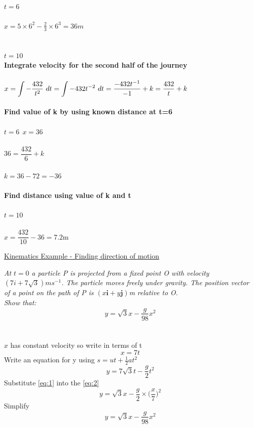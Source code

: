 \documentclass{article}[18pt]
\begin{document}
\\
$t=6$\\
\\
$x=5\times6^2-\frac{2}{3}\times6^3=36m$\\
\\
\\
$\mathit{t = 10}$
\\
\textbf{Integrate velocity for the second half of the journey}\\
\\
$x=\mathlarger{\int-\dfrac{432}{t^2} \ dt=\int-432t^{-2} \ dt=\dfrac{-432t^{-1}}{-1}+k=\dfrac{432}{t}+k}$\\
\\
\textbf{Find value of k by using known distance at t=6}\\
\\
$t=6 \ \ x=36$\\
\\
$36=\dfrac{432}{6}+k$\\
\\
$k=36-72=-36$\\
\\
\textbf{Find distance using value of k and t}\\
\\
$t=10$\\
\\
$x=\dfrac{432}{10}-36=7.2\text{m}$
\newpage
\begin{center}
\underline{\huge Kinematics Example - Finding direction of motion}
\end{center}
\textit{At $t=0$ a particle P is projected from a fixed point O with velocity $(7i+7\sqrt{3})ms^{-1}$. The particle moves freely under gravity. The position vector of a point on the path of P is $(x\mathbf{i}+y\mathbf{j})$m relative to O.}\\
\textit{Show that:}
$$y=\sqrt{3}x-\frac{g}{98}x^2$$
\\
\\
$x$ has constant velocity so write in terms of t
\begin{equation}\label{eq:1}
x=7t
\end{equation}
Write an equation for y using $s=ut+\frac{1}{2}at^2$
\begin{equation}\label{eq:2}
y=7\sqrt{3}t-\frac{g}{2}t^2
\end{equation}
Substitute \eqref{eq:1} into the \eqref{eq:2}
$$y=\sqrt{3}x-\frac{g}{2}\times\Big(\frac{x}{7}\Big)^2$$
Simplify
\begin{equation}\label{eq:3}
y=\sqrt{3}x-\frac{g}{98}x^2
\end{equation}
\end{document}
